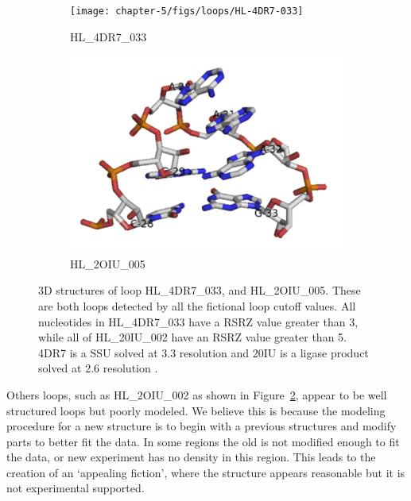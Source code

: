 \begin{figure}
  \begin{subfigure}[b]{0.45\textwidth}
    \texttt{[image: chapter-5/figs/loops/HL-4DR7-033]}
    \caption{HL\_4DR7\_033}
    \label{fig:hl-4dr7-033}
  \end{subfigure}
  \begin{subfigure}[b]{0.45\textwidth}
    \includegraphics[width=\textwidth]{chapter-5/figs/loops/HL-2OIU-005}
    \caption{HL\_2OIU\_005}
    \label{fig:hl-2oiu-002}
  \end{subfigure}
  \caption{3D structures of loop HL\_4DR7\_033, and HL\_2OIU\_005. These are
    both loops detected by all the fictional loop cutoff values. All nucleotides
    in HL\_4DR7\_033 have a RSRZ value greater than 3, while all of HL\_20IU\_002
    have an RSRZ value greater than 5. 4DR7 is a \TT{} SSU solved at
    3.3\angstrom{} resolution \cite{Demirci2013} and 20IU is a ligase product
      solved at 2.6\angstrom{} resolution \cite{Robertson2007}.}
  \label{fig:fictional-loops}
\end{figure}

Others loops, such as HL\_2OIU\_002 as shown in Figure~\ref{fig:hl-2oiu-002},
appear to be well structured loops but poorly modeled. We believe this is
because the modeling procedure for a new structure is to begin with a previous
structures and modify parts to better fit the data. In some regions the old is
not modified enough to fit the data, or new experiment has no density in this
region. This leads to the creation of an ‘appealing fiction’, where the
structure appears reasonable but it is not experimental supported.

